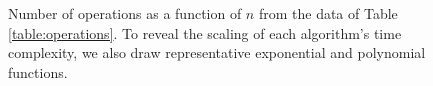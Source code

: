 \begin{figure}[htpb]
\centering
{}
\caption{Number of operations as a function of $n$ from the data of Table \ref{table:operations}. To reveal the scaling of each algorithm's time complexity, we also draw representative exponential and polynomial functions.}
\label{fig:operations}
\end{figure} %